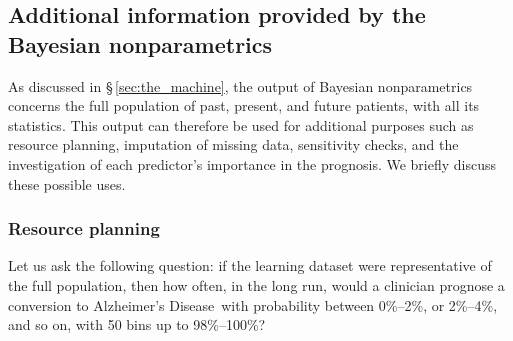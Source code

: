 \documentclass[a4paper,12pt,%
onecolumn,oneside,article,%
british%
]{memoir}
\theoremstyle{remark}
\theoremstyle{innote}
\renewcommand*{\|}[1][]{\nonscript\:#1\vert\nonscript\:\mathopen{}}
\newcommand*{\sect}{\S}%
\newcommand*{\ad}{Alzheimer's Disease}
\begin{document}



\bigskip%
\subsection{Additional information provided by the Bayesian nonparametrics}
\label{sec:additional_results}

As discussed in \sect\,\ref{sec:the_machine}, the output of Bayesian nonparametrics concerns the full population of past, present, and future patients, with all its statistics. This output can therefore be used for additional purposes such as resource planning, imputation of missing data, sensitivity checks, and the investigation of each predictor's importance in the prognosis. We briefly discuss these possible uses.

\subsubsection{Resource planning}
\label{sec:resource_planning}

Let us ask the following question: if the learning dataset were representative of the full population, then how often, in the long run, would a clinician prognose a conversion to \ad\ with probability between 0\%--2\%, or 2\%--4\%, and so on, with 50 bins up to 98\%--100\%?
\end{document}
